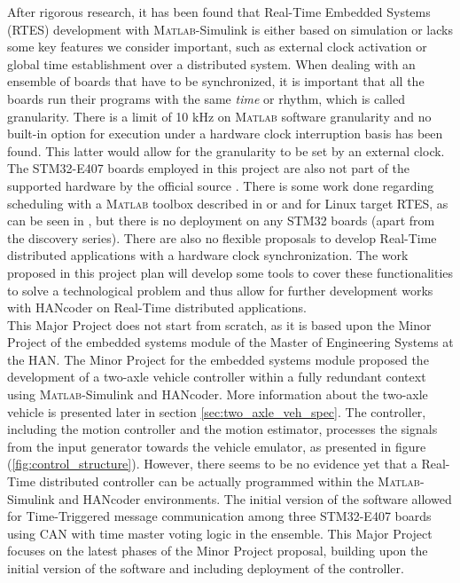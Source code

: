 \documentclass[table,xcdraw]{article}
\begin{document}
After rigorous research, it has been found that Real-Time Embedded Systems (RTES) development with \textsc{Matlab}-Simulink is either based on simulation or lacks some key features we consider important, such as external clock activation or global time establishment over a distributed system. When dealing with an ensemble of boards that have to be synchronized, it is important that all the boards run their programs with the same \textit{time} or rhythm, which is called granularity. There is a limit of 10 kHz on \textsc{Matlab} software granularity and no built-in option for execution under a hardware clock interruption basis has been found. This latter would allow for the granularity to be set by an external clock. The STM32-E407 boards employed in this project are also not part of the supported hardware by the official source \citep{embedded_simulink_supported_hardware}. There is some work done regarding scheduling with a \textsc{Matlab} toolbox described in \citep{Torsche_1} or \citep{Torsche_2} and for Linux target RTES, as can be seen in \citep{Matlab_RTE_Linux}, but there is no deployment on any STM32 boards (apart from the discovery series). There are also no flexible proposals to develop Real-Time distributed applications with a hardware clock synchronization. The work proposed in this project plan will develop some tools to cover these functionalities to solve a technological problem and thus allow for further development works with HANcoder on Real-Time distributed applications.\\


This Major Project does not start from scratch, as it is based upon the Minor Project of the embedded systems module of the Master of Engineering Systems at the HAN. The Minor Project for the embedded systems module proposed the development of a two-axle vehicle controller within a fully redundant context using \textsc{Matlab}-Simulink and HANcoder. More information about the two-axle vehicle is presented later in section \ref{sec:two_axle_veh_spec}. The controller, including the motion controller and the motion estimator, processes the signals from the input generator towards the vehicle emulator, as presented in figure (\ref{fig:control_structure}). However, there seems to be no evidence yet that a Real-Time distributed controller can be actually programmed within the \textsc{Matlab}-Simulink and HANcoder environments. The initial version of the software allowed for Time-Triggered message communication among three STM32-E407 boards using CAN with time master voting logic in the ensemble. This Major Project focuses on the latest phases of the Minor Project proposal, building upon the initial version of the software and including deployment of the controller.\\
\end{document}
